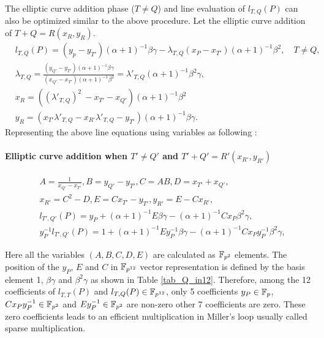 The elliptic curve addition phase \texorpdfstring{($T\neq Q$)}{} and line evaluation of $ l_{T,Q}(P)$ can also be optimized similar to the above procedure. Let the elliptic curve addition of $T+Q = R(x_R, y_R)$.
\begin{eqnarray}
&  l_{T,Q}(P) = (y_p-y_{T'}) (\alpha+1)^{-1}\beta\gamma- \lambda_{T,Q}(x_P-x_{T'}) (\alpha+1)^{-1}\beta^2,  \quad \text{$T \neq Q$,} \nonumber \\
&\lambda_{T,Q}= \frac{( y_{Q'}-y_{T'})(\alpha+1)^{-1}\beta\gamma}{( x_{Q'}-x_{T'})(\alpha+1)^{-1}\beta^2} = \lambda'_{T,Q} (\alpha+1)^{-1}\beta^2\gamma, \nonumber\\
& x_{R} = ((\lambda'_{T,Q})^2  \ - x_{T'} -x_{Q'})(\alpha+1)^{-1}\beta^2 \nonumber \\
 & y_{R}=(x_{T'}\lambda'_{T,Q} -x_{R'}\lambda'_{T,Q}-y_{T'})(\alpha+1)^{-1}\beta \gamma \nonumber.
\end{eqnarray}
Representing the above line equations using variables as following :
\paragraph*{Elliptic curve addition when $T' \neq Q'$ and $T'+Q'=R'(x_{R'},y_{R'})$}
\begin{subequations}
\begin{eqnarray}
&A=\frac{1}{x_{Q'}-x_{T'}}, B=y_{Q'}-y_{T'}, C=AB, D=x_{T'}+x_{Q'},\nonumber\\
 & x_{R'}=C^2-D, E= Cx_{T'}-y_{T'}, y_{R'}=E-Cx_{R'},\nonumber\\
&l_{T',Q'}(P)= y_P+(\alpha+1)^{-1}E\beta\gamma-(\alpha+1)^{-1}Cx_P\beta^2 \gamma, \label{sparse_add_bn_1} \\
&y_{P}^{-1}l_{T',Q'}(P)= 1+(\alpha+1)^{-1}Ey_{P}^{-1}\beta\gamma-(\alpha+1)^{-1}Cx_Py_{P}^{-1}\beta^2 \gamma, \label{sparse_add_bn_2}
\end{eqnarray}
\end{subequations}
 
Here all the variables $(A,B,C, D, E)$  are calculated as $\mathbb{F}_{p^2}$ elements.
The  position of the $y_P$, $E$ and $C$ in $\mathbb{F}_{p^{12}}$ vector representation is defined by the basis element 1, $\beta\gamma$ and $\beta^2\gamma$ as shown in Table \ref{tab_Q_in12}. 
Therefore,  among the 12 coefficients of  $l_{T,T}(P)$ and $l_{T,Q}(P)\in \mathbb{F}_{p^{12}}$, only 5 coefficients $y_P\in {\mathbb{F}}_{p}$, $Cx_Py_{P}^{-1}\in \mathbb{F}_{p^2}$ and $Ey_{P}^{-1}\in \mathbb{F}_{p^2}$ are  non-zero other 7 coefficients are zero. These zero coefficients leads to an efficient multiplication in Miller's loop usually called sparse multiplication. 

